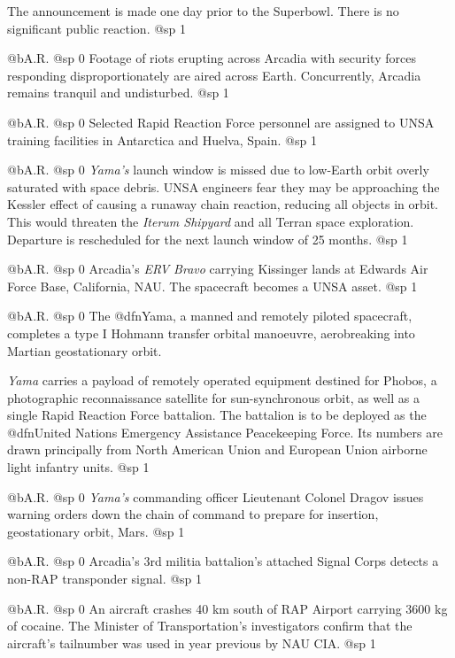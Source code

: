 The announcement is made one day prior to the Superbowl. There is no significant public reaction.
@sp 1

@b{A.R.}
@sp 0
Footage of riots erupting across Arcadia with security forces responding disproportionately are aired across Earth. Concurrently, Arcadia remains tranquil and undisturbed.
@sp 1

@b{A.R.}
@sp 0
Selected Rapid Reaction Force personnel are assigned to UNSA training facilities in Antarctica and Huelva, Spain.
@sp 1

@b{A.R.}
@sp 0
{\it Yama's} launch window is missed due to low-Earth orbit overly saturated with space debris. UNSA engineers fear they may be approaching the Kessler effect of causing a runaway chain reaction, reducing all objects in orbit. This would threaten the {\it Iterum Shipyard} and all Terran space exploration. Departure is rescheduled for the next launch window of 25 months.
@sp 1

@b{A.R.}
@sp 0
Arcadia's {\it ERV Bravo} carrying Kissinger lands at Edwards Air Force Base, California, NAU. The spacecraft becomes a UNSA asset.
@sp 1

@b{A.R.}
@sp 0
The @dfn{Yama}, a manned and remotely piloted spacecraft, completes a type I Hohmann transfer orbital manoeuvre, aerobreaking into Martian geostationary orbit. 

{\it Yama} carries a payload of remotely operated equipment destined for Phobos, a photographic reconnaissance satellite for sun-synchronous orbit, as well as a single Rapid Reaction Force battalion. The battalion is to be deployed as the @dfn{United Nations Emergency Assistance Peacekeeping Force}. Its numbers are drawn principally from North American Union and European Union airborne light infantry units.
@sp 1

@b{A.R.}
@sp 0
{\it Yama's} commanding officer Lieutenant Colonel Dragov issues warning orders down the chain of command to prepare for insertion, geostationary orbit, Mars.
@sp 1

@b{A.R.}
@sp 0
Arcadia's 3rd militia battalion's attached Signal Corps detects a non-RAP transponder signal.
@sp 1

@b{A.R.}
@sp 0
An aircraft crashes 40 km south of RAP Airport carrying 3600 kg of cocaine. The Minister of Transportation's investigators confirm that the aircraft's tailnumber was used in year previous by NAU CIA.
@sp 1


